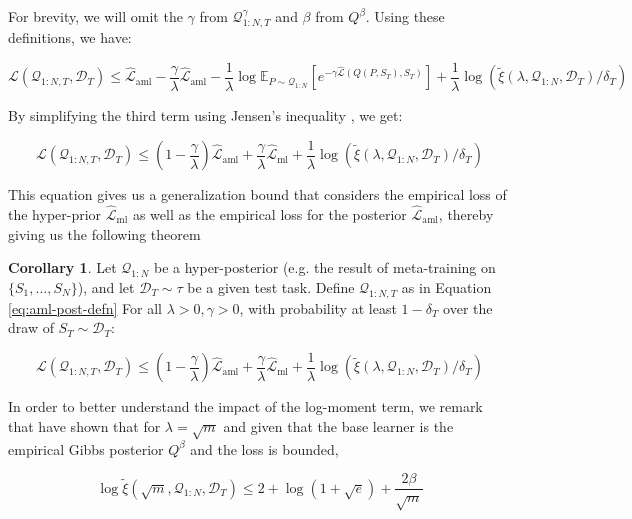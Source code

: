 \documentclass{article}
\theoremstyle{definition}
\newtheorem{corollary}[theorem]{Corollary}
\begin{document}
For brevity, we will omit the $\gamma$ from $\mathcal{Q}^{\gamma}_{1:N,T}$ and $\beta$ from $Q^{\beta}$. Using these definitions, we have:

$$\mathcal{L}(\mathcal{Q}_{1:N,T}, \mathcal{D}_T) \leq \hat{\mathcal{L}}_{\mathrm{aml}} -\frac{\gamma}{\lambda}\hat{\mathcal{L}}_{\mathrm{aml}} - \frac{1}{\lambda}\log \mathbb{E}_{P\sim \mathcal{Q}_{1:N}}\left [e^{-\gamma\hat{\mathcal{L}}(Q(P,S_T),S_T)}\right ]+\frac{1}{\lambda}\log\left (\tilde{\xi}(\lambda,\mathcal{Q}_{1:N},\mathcal{D}_T)/\delta_T\right )$$

By simplifying the third term using Jensen's inequality , we get:

\begin{equation} \label{eq:pb-adapt-multi}
\mathcal{L}(\mathcal{Q}_{1:N,T}, \mathcal{D}_T) \leq 
(1-\frac{\gamma}{\lambda})\hat{\mathcal{L}}_{\mathrm{aml}} + \frac{\gamma}{\lambda}\hat{\mathcal{L}}_{\mathrm{ml}} 
+\frac{1}{\lambda}\log\left (\tilde{\xi}(\lambda,\mathcal{Q}_{1:N},\mathcal{D}_T)/\delta_T\right )
\end{equation}

This equation gives us a generalization bound that considers the empirical loss of the hyper-prior $\hat{\mathcal{L}}_{\mathrm{ml}}$ as well as the empirical loss for the posterior $\hat{\mathcal{L}}_{\mathrm{aml}}$, thereby giving us the following theorem

\begin{corollary} \label{thm:main-result-gibbs}
	Let $\mathcal{Q}_{1:N}$ be a hyper-posterior (e.g. the result of meta-training on $\{S_1,...,S_N\}$), and let $\mathcal{D}_T\sim \tau$ be a given test task. Define  $\mathcal{Q}_{1:N,T}$ as in Equation \ref{eq:aml-post-defn} 
	For all $\lambda>0, \gamma>0$, 
	with probability at least $1-\delta_T$ over the draw of $S_T\sim \mathcal{D}_T$:
	
	$$\mathcal{L}(\mathcal{Q}_{1:N,T}, \mathcal{D}_T) \leq 
	(1-\frac{\gamma}{\lambda})\hat{\mathcal{L}}_{\mathrm{aml}} + \frac{\gamma}{\lambda}\hat{\mathcal{L}}_{\mathrm{ml}} 
	+\frac{1}{\lambda}\log\left (\tilde{\xi}(\lambda,\mathcal{Q}_{1:N},\mathcal{D}_T)/\delta_T\right )$$
\end{corollary}

In order to better understand the impact of the log-moment term, we remark that \citet{Rivasplata2020} have shown that for $\lambda=\sqrt{m}$ and given that the base learner is the empirical Gibbs posterior $Q^\beta$ and the loss is bounded,

$$\log\tilde{\xi}(\sqrt{m},\mathcal{Q}_{1:N},\mathcal{D}_T) \leq 2+\log(1+\sqrt{e})+\frac{2\beta}{\sqrt{m}} $$
\end{document}
